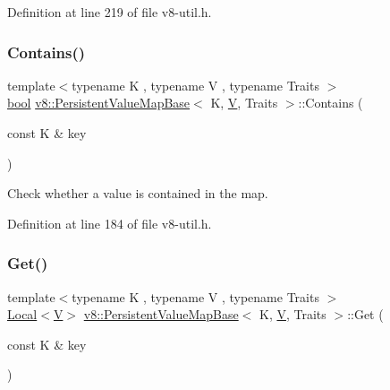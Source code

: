 Definition at line 219 of file v8-\/util.\+h.

\mbox{\label{classv8_1_1PersistentValueMapBase_a8c68e5f99c4042541c6d32232c97282a}} 
\subsubsection{\texorpdfstring{Contains()}{Contains()}}
{\footnotesize\ttfamily template$<$typename K , typename V , typename Traits $>$ \\
\mbox{\hyperlink{classbool}{bool}} \mbox{\hyperlink{classv8_1_1PersistentValueMapBase}{v8\+::\+Persistent\+Value\+Map\+Base}}$<$ K, \mbox{\hyperlink{classV}{V}}, Traits $>$\+::Contains (\begin{DoxyParamCaption}\item[{const K \&}]{key }\end{DoxyParamCaption})\hspace{0.3cm}{\ttfamily [inline]}}

Check whether a value is contained in the map. 

Definition at line 184 of file v8-\/util.\+h.

\mbox{\label{classv8_1_1PersistentValueMapBase_a16b8f906ea42036c2f37d44813bf2a72}} 
\subsubsection{\texorpdfstring{Get()}{Get()}}
{\footnotesize\ttfamily template$<$typename K , typename V , typename Traits $>$ \\
\mbox{\hyperlink{classv8_1_1Local}{Local}}$<$\mbox{\hyperlink{classV}{V}}$>$ \mbox{\hyperlink{classv8_1_1PersistentValueMapBase}{v8\+::\+Persistent\+Value\+Map\+Base}}$<$ K, \mbox{\hyperlink{classV}{V}}, Traits $>$\+::Get (\begin{DoxyParamCaption}\item[{const K \&}]{key }\end{DoxyParamCaption})\hspace{0.3cm}{\ttfamily [inline]}}

